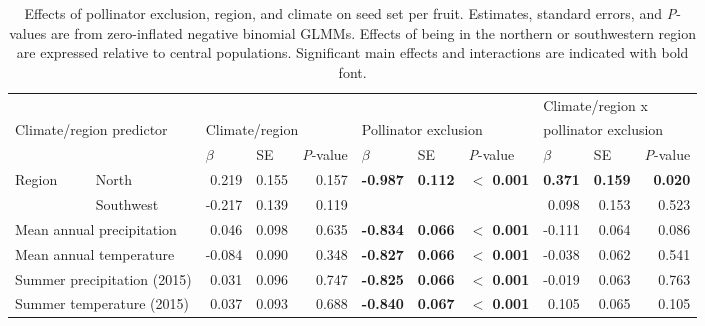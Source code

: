 \documentclass{article}
\begin{document}
\begin{landscape}
\begin{table}[p]
\centering
\caption[Effects of pollinator exclusion, region, and climate on seed set per fruit.]{Effects of pollinator exclusion, region, and climate on seed set per fruit. Estimates, standard errors, and \textit{P}-values are from zero-inflated negative binomial GLMMs. Effects of being in the northern or southwestern region are expressed relative to central populations. Significant main effects and interactions are indicated with bold font.}
\label{seedstable}
\begin{tabular}{llrrrrrrrrr}
\toprule
                            &                     &  & &                        &  &  &   & \multicolumn{3}{l}{Climate/region x}           \\
\multicolumn{2}{l}{Climate/region predictor}          & \multicolumn{3}{l}{Climate/region} &    \multicolumn{3}{l}{Pollinator exclusion}                               & \multicolumn{3}{l}{pollinator exclusion} \\
                            &                     & \multicolumn{1}{l}{$\beta$} & \multicolumn{1}{l}{SE} & \multicolumn{1}{l}{\textit{P}-value} &  \multicolumn{1}{l}{$\beta$}  & \multicolumn{1}{l}{SE} &  \multicolumn{1}{l}{\textit{P}-value} &  \multicolumn{1}{l}{$\beta$}  & \multicolumn{1}{l}{SE} &  \multicolumn{1}{l}{\textit{P}-value} \\
\midrule
\multirow{2}{*}{Region}     & North               & 0.219    & 0.155    & 0.157       & \multirow{2}{*}{\textbf{-0.987}} & \multirow{2}{*}{\textbf{0.112}} & \multirow{2}{*}{\textbf{$<$ 0.001}} & \textbf{0.371} & \textbf{0.159} & \textbf{0.020} \\
                            & Southwest           & -0.217   & 0.139    & 0.119       &        &       &                         & 0.098        & 0.153      & 0.523        \\
\midrule
\multicolumn{2}{l}{Mean annual precipitation}     & 0.046    & 0.098    & 0.635       & \textbf{-0.834} & \textbf{0.066} & \textbf{$<$ 0.001}               & -0.111       & 0.064      & 0.086        \\
\multicolumn{2}{l}{Mean annual temperature}       & -0.084   & 0.090    & 0.348       & \textbf{-0.827} & \textbf{0.066} & \textbf{$<$ 0.001}               & -0.038       & 0.062      & 0.541        \\
\multicolumn{2}{l}{Summer precipitation (2015)}   & 0.031    & 0.096    & 0.747       & \textbf{-0.825} & \textbf{0.066} & \textbf{$<$ 0.001}               & -0.019       & 0.063      & 0.763        \\
\multicolumn{2}{l}{Summer temperature (2015)}     & 0.037    & 0.093    & 0.688       & \textbf{-0.840} & \textbf{0.067} & \textbf{$<$ 0.001}               & 0.105        & 0.065      & 0.105        \\
\bottomrule
\end{tabular}
\end{table}



\end{landscape}
\end{document}
